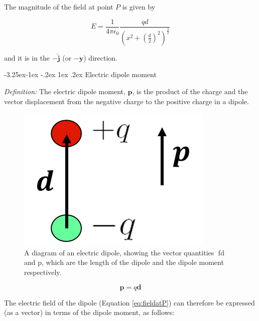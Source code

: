 \documentclass[
]{book}
\makeatletter
\renewcommand\subsection{%
\@startsection{subsection}{2}{\z@}%
              {-3.25ex\@plus -1ex \@minus -.2ex}%
              {1ex \@plus .2ex}%
              {\sffamily\bfseries}}
\numberwithin{equation}{section}
\makeatother
\begin{document}
The magnitude of the field at point \(P\) is given by

\begin{equation}
\label{eq:fieldatP}
E = \frac{1}{4 \pi \epsilon_0} \frac{qd}{\left( x^2 + \left( \frac{d}{2} \right)^2 \right)^{\frac{3}{2}}}
\end{equation}

and it is in the \(-\hat{\mathbf{j}}\) (or \(-\hat{\mathbf{y}}\)) direction.

\hypertarget{electric-dipole-moment}{%
\subsection{Electric dipole moment}\label{electric-dipole-moment}}

\emph{Definition:} The electric dipole moment, \(\mathbf{p}\), is the product of the
charge and the vector displacement from the negative charge to the
positive charge in a dipole.

\begin{figure}

{\centering \includegraphics[width=0.7\linewidth]{Figures/dipole_moment} 

}

\caption{A diagram of an electric dipole, showing the vector quantities f{d} and p, which are the length of the dipole and the dipole moment respectively.}\label{fig:dipoleMoment}
\end{figure}

\begin{equation}
\label{eq:dipoleMoment}
\mathbf{p} = q \mathbf{d}
\end{equation}

The electric field of the dipole (Equation
\eqref{eq:fieldatP}) can therefore be expressed (as a vector) in
terms of the dipole moment, as follows:
\end{document}

